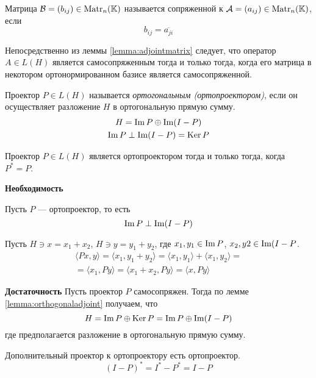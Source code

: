 \begin{definition}
    Матрица $\mathcal{B} = (b_{ij}) \in \mathrm{Matr}_{n}({\mathbb{K}})$ называется сопряженной к
    $\mathcal{A} = (a_{ij}) \in \mathrm{Matr}_{n}({\mathbb{K}})$, если
    \[ b_{ij} = \overline{a_{ji}} \]
\end{definition}

Непосредственно из леммы \ref{lemma:adjointmatrix} следует, что оператор $A\in
L(H)$ является самосопряженным тогда и только тогда, когда его матрица в
некотором ортонормированном базисе является самосопряженной.

\begin{definition}
    Проектор $P\in L(H)$ называется \emph{ортогональным (ортопроектором)}, если
    он осуществляет разложение $H$ в ортогональную прямую сумму.
    \begin{gather*}
        H = \operatorname{Im} P \oplus \operatorname{Im} (I - P) \\
        \operatorname{Im} P \perp \operatorname{Im} (I - P) = \operatorname{Ker} P
    \end{gather*}
\end{definition}

\begin{lemma}
    Проектор $P\in L(H)$ является ортопроектором тогда и только тогда, когда
    $P^* = P$.    
\end{lemma}

\begin{proofbreak}
    \dindent \textbf{Необходимость}

    Пусть $P$ — ортопроектор, то есть
    \[ \operatorname{Im} P \perp \operatorname{Im} (I - P) \]

    Пусть $H \ni x = x_1 + x_2$, $H \ni y = y_1 + y_2$, где $x_1, y_1 \in \operatorname{Im}
    P$, $x_2, y2 \in \operatorname{Im} (I - P$.
    \begin{multline*}
        \langle Px, y\rangle = \langle x_1, y_1 + y_2 \rangle = 
        \langle x_1, y_1 \rangle + \langle x_1, y_2 \rangle =\\= 
        \langle x_1, Py \rangle = \langle x_1 + x_2, Py
        \rangle = \langle x, Py \rangle
    \end{multline*}

    \textbf{Достаточность}
    Пусть проектор $P$ самосопряжен. Тогда по лемме
    \ref{lemma:orthogonaladjoint} получаем, что 
    \[ H = \operatorname{Im} P \oplus \operatorname{Ker} P = \operatorname{Im} P \oplus \operatorname{Im} (I - P) \]
    где предполагается разложение в ортогональную прямую сумму.
\end{proofbreak}

\begin{corollaryle}
    Дополнительный проектор к ортопроектору есть ортопроектор.
    \[ (I - P)^* = I^* - P^* = I - P \]
\end{corollaryle}


